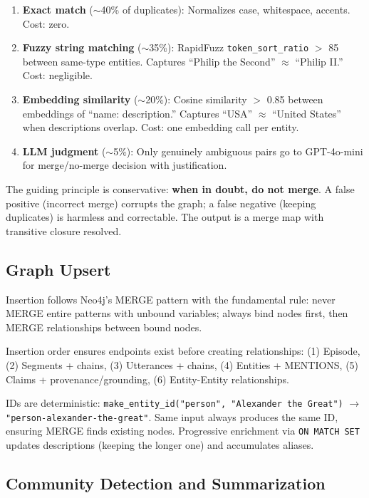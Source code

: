 \begin{enumerate}
    \item \textbf{Exact match} ($\sim$40\% of duplicates): Normalizes case, whitespace, accents. Cost: zero.
    \item \textbf{Fuzzy string matching} ($\sim$35\%): RapidFuzz \texttt{token\_sort\_ratio} $>$ 85 between same-type entities. Captures ``Philip the Second'' $\approx$ ``Philip II.'' Cost: negligible.
    \item \textbf{Embedding similarity} ($\sim$20\%): Cosine similarity $>$ 0.85 between embeddings of ``name: description.'' Captures ``USA'' $\approx$ ``United States'' when descriptions overlap. Cost: one embedding call per entity.
    \item \textbf{LLM judgment} ($\sim$5\%): Only genuinely ambiguous pairs go to GPT-4o-mini for merge/no-merge decision with justification.
\end{enumerate}

The guiding principle is conservative: \textbf{when in doubt, do not merge}. A false positive (incorrect merge) corrupts the graph; a false negative (keeping duplicates) is harmless and correctable. The output is a merge map with transitive closure resolved.

\subsection{Graph Upsert}

Insertion follows Neo4j's MERGE pattern with the fundamental rule: never MERGE entire patterns with unbound variables; always bind nodes first, then MERGE relationships between bound nodes.

Insertion order ensures endpoints exist before creating relationships: (1) Episode, (2) Segments + chains, (3) Utterances + chains, (4) Entities + MENTIONS, (5) Claims + provenance/grounding, (6) Entity-Entity relationships.

IDs are deterministic: \texttt{make\_entity\_id("person", "Alexander the Great")} $\rightarrow$ \texttt{"person-alexander-the-great"}. Same input always produces the same ID, ensuring MERGE finds existing nodes. Progressive enrichment via \texttt{ON MATCH SET} updates descriptions (keeping the longer one) and accumulates aliases.

\subsection{Community Detection and Summarization}

